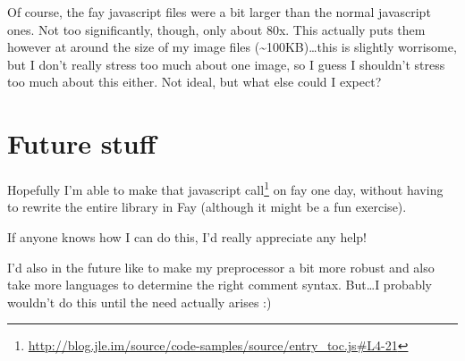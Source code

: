 \documentclass[]{article}
\renewcommand{\href}[2]{#2\footnote{\url{#1}}}
\begin{document}
Of course, the fay javascript files were a bit larger than the normal javascript
ones. Not too significantly, though, only about 80x. This actually puts them
however at around the size of my image files
(\textasciitilde{}100KB)\ldots{}this is slightly worrisome, but I don't really
stress too much about one image, so I guess I shouldn't stress too much about
this either. Not ideal, but what else could I expect?

\section{Future stuff}\label{future-stuff}

Hopefully I'm able to make
\href{http://blog.jle.im/source/code-samples/source/entry_toc.js\#L4-21}{that
javascript call} on fay one day, without having to rewrite the entire library in
Fay (although it might be a fun exercise).

If anyone knows how I can do this, I'd really appreciate any help!

I'd also in the future like to make my preprocessor a bit more robust and also
take more languages to determine the right comment syntax. But\ldots{}I probably
wouldn't do this until the need actually arises :)
\end{document}
